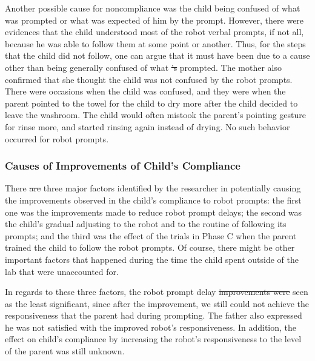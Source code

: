 \documentclass{ut-thesis}
\providecommand{\DIFaddtex}[1]{{\protect\color{blue}\uwave{#1}}} %
\providecommand{\DIFdeltex}[1]{{\protect\color{red}\sout{#1}}}                      %
\providecommand{\DIFaddbegin}{} %
\providecommand{\DIFaddend}{} %
\providecommand{\DIFdelbegin}{} %
\providecommand{\DIFdelend}{} %
\providecommand{\DIFadd}[1]{\texorpdfstring{\DIFaddtex{#1}}{#1}} %
\providecommand{\DIFdel}[1]{\texorpdfstring{\DIFdeltex{#1}}{}} %
\begin{document}
Another possible cause for noncompliance was the child being confused of what was prompted or what was expected of him by the prompt.  However, there were evidences that the child understood most of the robot verbal prompts, if not all, because he was able to follow them at some point or another.  Thus, for the steps that the child did not follow, one can argue that it must have been due to a cause other than being generally confused of what \DIFdelbegin \DIFdel{'s }\DIFdelend \DIFaddbegin \DIFadd{was }\DIFaddend prompted.  The mother also confirmed that she thought the child was not confused by the robot prompts.  There were occasions when the child was confused, and they were when the parent pointed to the towel for the child to dry more after the child decided to leave the washroom.  The child would often mistook the parent's pointing gesture for rinse more, and started rinsing again instead of drying.  No such behavior occurred for robot prompts.


\subsubsection{Causes of Improvements of Child's Compliance}
There \DIFdelbegin \DIFdel{are }\DIFdelend \DIFaddbegin \DIFadd{were }\DIFaddend three major factors identified by the researcher in potentially causing the improvements observed in the child's compliance to robot prompts: the first one was the improvements made to reduce robot prompt delays; the second was the child's gradual adjusting to the robot and to the routine of following its prompts; and the third was the effect of the trials in Phase C when the parent trained the child to follow the robot prompts.  Of course, there might be other important factors that happened during the time the child spent outside of the lab that were unaccounted for.

In regards to these three factors, the robot prompt delay \DIFdelbegin \DIFdel{improvements were }\DIFdelend \DIFaddbegin \DIFadd{improvement was }\DIFaddend seen as the least significant, since \DIFaddbegin \DIFadd{even }\DIFaddend after the improvement, we still could not achieve the responsiveness that the parent had during prompting.  The father also expressed he was not satisfied with the improved robot's responsiveness.   In addition, the effect on child's compliance by increasing the robot's responsiveness to the level of the parent was still unknown.
\DIFaddbegin 
\end{document}
